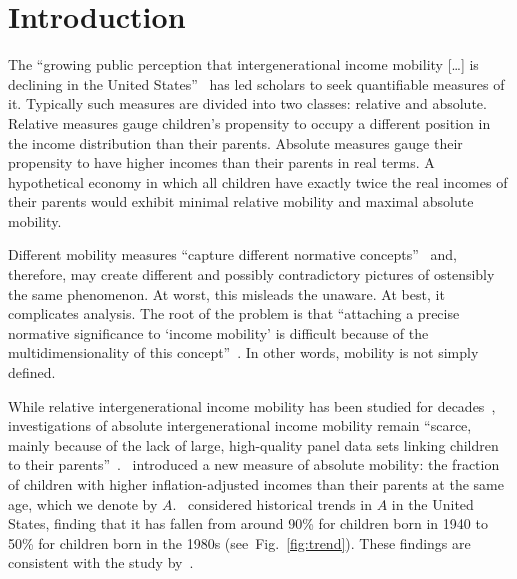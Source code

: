 \documentclass[12pt,a4paper]{article}
\newcommand{\fref}[1]{Fig.~\ref{fig:#1}}
\numberwithin{equation}{section}
\begin{document}
\doublespacing

\section{Introduction} \label{sec:introduction}

The ``growing public perception that intergenerational income mobility [\ldots] is declining in the United States''~\citep[p.~141]{chetty2014united} has led scholars to seek quantifiable measures of it. Typically such measures are divided into two classes: relative and absolute. Relative measures gauge children's propensity to occupy a different position in the income distribution than their parents. Absolute measures gauge their propensity to have higher incomes than their parents in real terms. A hypothetical economy in which all children have exactly twice the real incomes of their parents would exhibit minimal relative mobility and maximal absolute mobility. 

Different mobility measures ``capture different normative concepts''~\citep[p.~1560]{chetty2014land} and, therefore, may create different and possibly contradictory pictures of ostensibly the same phenomenon. At worst, this misleads the unaware. At best, it complicates analysis. The root of the problem is that ``attaching a precise normative significance to `income mobility' is difficult because of the multidimensionality of this concept''~\citep[p.~588]{fields1999measurement}. In other words, mobility is not simply defined.

While relative intergenerational income mobility has been studied for decades~\citep{becker1979equilibrium,borjas1992ethnic,piketty2000theories,mazumder2005fortunate,aaronson2008intergenerational,lee2009trends,hauser2010intergenerational,corak2013income,chetty2014united,berman2016understanding}, investigations of absolute intergenerational income mobility remain ``scarce, mainly because of the lack of large, high-quality panel data sets linking children to their parents''~\citep[p.~398]{chetty2017fading}.~\citet[p.~1563]{chetty2014land} introduced a new measure of absolute mobility: the fraction of children with higher inflation-adjusted incomes than their parents at the same age, which we denote by $A$.~\citet{chetty2017fading} considered historical trends in $A$ in the United States, finding that it has fallen from around 90\% for children born in 1940 to 50\% for children born in the 1980s (see~\fref{trend}). These findings are consistent with the study by~\citet{isaacs2007economic}.
\end{document}
